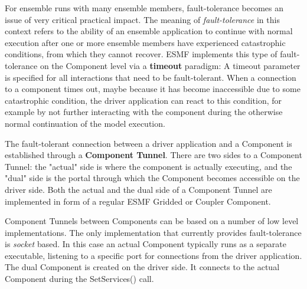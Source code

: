 %

\label{sec:CompTunnel}

For ensemble runs with many ensemble members, fault-tolerance becomes an issue of very critical practical impact. The meaning of {\em fault-tolerance} in this context refers to the ability of an ensemble application to continue with normal execution after one or more ensemble members have experienced catastrophic conditions, from which they cannot recover. ESMF implements this type of fault-tolerance on the Component level via a {\bf timeout} paradigm: A timeout parameter is specified for all interactions that need to be fault-tolerant. When a connection to a component times out, maybe because it has become inaccessible due to some catastrophic condition, the driver application can react to this condition, for example by not further interacting with the component during the otherwise normal continuation of the model execution.

The fault-tolerant connection between a driver application and a Component is established through a {\bf Component Tunnel}. There are two sides to a Component Tunnel: the "actual" side is where the component is actually executing, and the "dual" side is the portal through which the Component becomes accessible on the driver side. Both the actual and the dual side of a Component Tunnel are implemented in form of a regular ESMF Gridded or Coupler Component.

Component Tunnels between Components can be based on a number of low level implementations. The only implementation that currently provides fault-tolerance is {\em socket} based. In this case an actual Component typically runs as a separate executable, listening to a specific port for connections from the driver application. The dual Component is created on the driver side. It connects to the actual Component during the SetServices() call.

